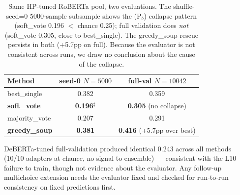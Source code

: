 \documentclass[11pt]{article}
\begin{document}
\begin{table}[h]
\centering
\caption{Same HP-tuned RoBERTa pool, two evaluations. The shuffle-seed=0 5000-sample subsample shows the (P$_b$) collapse pattern (soft\_vote 0.196 $<$ chance 0.25); full validation does \emph{not} (soft\_vote 0.305, close to best\_single). The greedy\_soup rescue persists in both (+5.7pp on full). Because the evaluator is not consistent across runs, we draw no conclusion about the cause of the collapse.}
\label{tab:fullval_roberta}
\small
\setlength{\tabcolsep}{4pt}
\begin{tabular}{@{}lcc@{}}
\toprule
Method & seed-0 $N{=}5000$ & full-val $N{=}10042$ \\
\midrule
best\_single   & 0.382 & 0.359 \\
\textbf{soft\_vote}     & \textbf{0.196}$^{\ddagger}$ & \textbf{0.305} (no collapse) \\
majority\_vote & 0.207 & 0.291 \\
\textbf{greedy\_soup}   & \textbf{0.381} & \textbf{0.416} (+5.7pp over best) \\
\bottomrule
\end{tabular}
\end{table}

DeBERTa-tuned full-validation produced identical $0.243$ across all methods (10/10 adapters at chance, no signal to ensemble) --- consistent with the L10 failure to train, though not evidence about the evaluator. Any follow-up multichoice extension needs the evaluator fixed and checked for run-to-run consistency on fixed predictions first.
\end{document}
